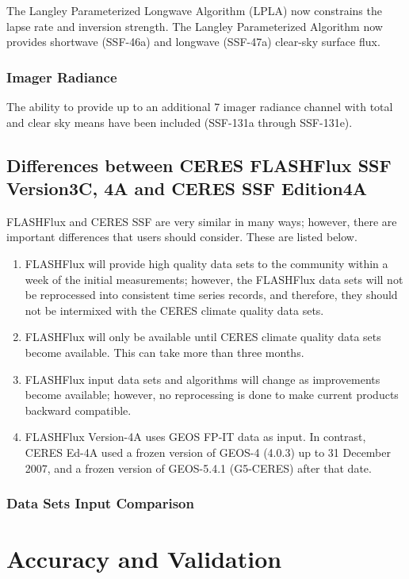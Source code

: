 \documentclass[12pt]{article}
\begin{document}
The Langley Parameterized Longwave Algorithm (LPLA) now constrains the lapse rate and inversion strength. The Langley Parameterized Algorithm now provides shortwave (SSF-46a) and longwave (SSF-47a) clear-sky surface flux. 

\subsubsection{Imager Radiance}
The ability to provide up to an additional 7 imager radiance channel with total and clear sky means have been included (SSF-131a through SSF-131e).

\subsection{Differences between CERES FLASHFlux SSF Version3C, 4A and CERES SSF Edition4A}

FLASHFlux and CERES SSF are very similar in many ways; however, there are important differences that users should consider. These are listed below.
\begin{enumerate}
\item FLASHFlux will provide high quality data sets to the community within a week of the initial measurements; however, the FLASHFlux data sets will not be reprocessed into consistent time series records, and therefore, they should not be intermixed with the CERES climate quality data sets.
\item FLASHFlux will only be available until CERES climate quality data sets become available. This can take more than three months.
\item FLASHFlux input data sets and algorithms will change as improvements become available; however, no reprocessing is done to make current products backward compatible.
\item FLASHFlux Version-4A uses GEOS FP-IT data as input. In contrast, CERES Ed-4A used a frozen version of GEOS-4 (4.0.3) up to 31 December 2007, and a frozen version of GEOS-5.4.1 (G5-CERES) after that date.
\end{enumerate}

\subsubsection{Data Sets Input Comparison}




\section{Accuracy and Validation}\label{validation}
\end{document}
